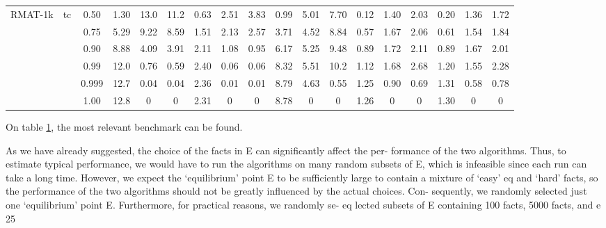 \documentclass[sigconf,screen,review,natbib]{acmart}
\theoremstyle{definition}
\begin{document}
\begin{table}[!ht]
\begin{center}
\begin{tabular}{|c|c|c|c|c|c|c|c|c|c|c|c|c|c|c|c|c|c|}
			\hline
			RMAT-1k & \multirow{6}{*}{tc}     & 0.50  & 1.30                      & 13.0                          & 11.2                       & 0.63                           & 2.51                     & 3.83 & 0.99 & 5.01 & 7.70 & 0.12 & 1.40 & 2.03 & 0.20 & 1.36 & 1.72 \\
			        &                         & 0.75  & 5.29                      & 9.22                          & 8.59                       & 1.51                           & 2.13                     & 2.57 & 3.71 & 4.52 & 8.84 & 0.57 & 1.67 & 2.06 & 0.61 & 1.54 & 1.84 \\
			        &                         & 0.90  & 8.88                      & 4.09                          & 3.91                       & 2.11                           & 1.08                     & 0.95 & 6.17 & 5.25 & 9.48 & 0.89 & 1.72 & 2.11 & 0.89 & 1.67 & 2.01 \\
			        &                         & 0.99  & 12.0                      & 0.76                          & 0.59                       & 2.40                           & 0.06                     & 0.06 & 8.32 & 5.51 & 10.2 & 1.12 & 1.68 & 2.68 & 1.20 & 1.55 & 2.28 \\
			        &                         & 0.999 & 12.7                      & 0.04                          & 0.04                       & 2.36                           & 0.01                     & 0.01 & 8.79 & 4.63 & 0.55 & 1.25 & 0.90 & 0.69 & 1.31 & 0.58 & 0.78 \\
			        &                         & 1.00  & 12.8                      & 0                             & 0                          & 2.31                           & 0                        & 0    & 8.78 & 0    & 0    & 1.26 & 0    & 0    & 1.30 & 0    & 0    \\
			\hline
		\end{tabular}
	\end{center}
	\label{tab:mainbenchmark}
\end{table}

On table \ref{tab:mainbenchmark}, the most relevant benchmark can be found.

As we have already suggested,
the choice of the facts in E can significantly affect the per-
formance of the two algorithms. Thus, to estimate typical
performance, we would have to run the algorithms on many
random subsets of E, which is infeasible since each run can
take a long time. However, we expect the ‘equilibrium’ point
E to be sufficiently large to contain a mixture of ‘easy’ eq
and ‘hard’ facts, so the performance of the two algorithms
should not be greatly influenced by the actual choices. Con-
sequently, we randomly selected just one ‘equilibrium’ point
E. Furthermore, for practical reasons, we randomly se- eq
lected subsets of E containing 100 facts, 5000 facts, and e
25%
\end{document}
